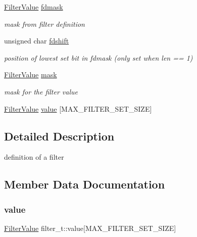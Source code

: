 \begin{DoxyCompactItemize}
\mbox{\label{structfilter__t_ac228e14b328ecffc695a47dbdc4e7c72}} 
\hyperlink{classFilterValue}{Filter\+Value} \hyperlink{structfilter__t_ac228e14b328ecffc695a47dbdc4e7c72}{fdmask}
\begin{DoxyCompactList}\small\item\em mask from filter definition \end{DoxyCompactList}\item 
\mbox{\label{structfilter__t_a42fe28ebb94afd681d5e495916e4a71d}} 
unsigned char \hyperlink{structfilter__t_a42fe28ebb94afd681d5e495916e4a71d}{fdshift}
\begin{DoxyCompactList}\small\item\em position of lowest set bit in fdmask (only set when len == 1) \end{DoxyCompactList}\item 
\mbox{\label{structfilter__t_a8b06d443a853adc1606cfae366ee9e80}} 
\hyperlink{classFilterValue}{Filter\+Value} \hyperlink{structfilter__t_a8b06d443a853adc1606cfae366ee9e80}{mask}
\begin{DoxyCompactList}\small\item\em mask for the filter value \end{DoxyCompactList}\item 
\hyperlink{classFilterValue}{Filter\+Value} \hyperlink{structfilter__t_a360ab1655062e64bbebdefd3acb749b6}{value} \mbox{[}M\+A\+X\+\_\+\+F\+I\+L\+T\+E\+R\+\_\+\+S\+E\+T\+\_\+\+S\+I\+ZE\mbox{]}
\end{DoxyCompactItemize}


\subsection{Detailed Description}
definition of a filter 

\subsection{Member Data Documentation}
\mbox{\label{structfilter__t_a360ab1655062e64bbebdefd3acb749b6}} 
\subsubsection{\texorpdfstring{value}{value}}
{\footnotesize\ttfamily \hyperlink{classFilterValue}{Filter\+Value} filter\+\_\+t\+::value\mbox{[}M\+A\+X\+\_\+\+F\+I\+L\+T\+E\+R\+\_\+\+S\+E\+T\+\_\+\+S\+I\+ZE\mbox{]}}

